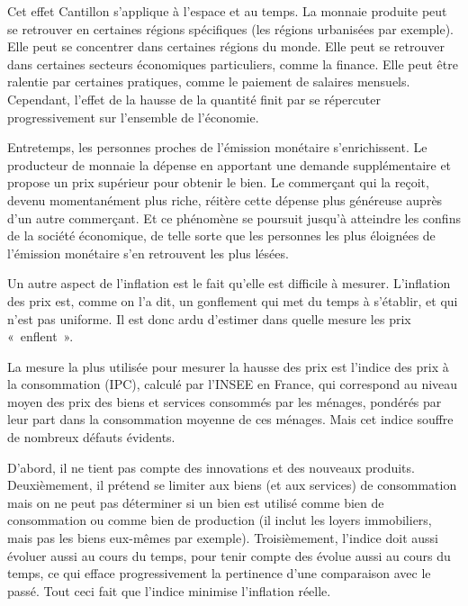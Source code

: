 Cet effet Cantillon s'applique à l'espace et au temps. La monnaie produite peut se retrouver en certaines régions spécifiques (les régions urbanisées par exemple). Elle peut se concentrer dans certaines régions du monde. Elle peut se retrouver dans certaines secteurs économiques particuliers, comme la finance. Elle peut être ralentie par certaines pratiques, comme le paiement de salaires mensuels. Cependant, l'effet de la hausse de la quantité finit par se répercuter progressivement sur l'ensemble de l'économie.

Entretemps, les personnes proches de l'émission monétaire s'enrichissent. Le producteur de monnaie la dépense en apportant une demande supplémentaire et propose un prix supérieur pour obtenir le bien. Le commerçant qui la reçoit, devenu momentanément plus riche, réitère cette dépense plus généreuse auprès d'un autre commerçant. Et ce phénomène se poursuit jusqu'à atteindre les confins de la société économique, de telle sorte que les personnes les plus éloignées de l'émission monétaire s'en retrouvent les plus lésées.


Un autre aspect de l'inflation est le fait qu'elle est difficile à mesurer. L'inflation des prix est, comme on l'a dit, un gonflement qui met du temps à s'établir, et qui n'est pas uniforme. Il est donc ardu d'estimer dans quelle mesure les prix «~enflent~».

La mesure la plus utilisée pour mesurer la hausse des prix est l'indice des prix à la consommation (IPC), calculé par l'INSEE en France, qui correspond au niveau moyen des prix des biens et services consommés par les ménages, pondérés par leur part dans la consommation moyenne de ces ménages. Mais cet indice souffre de nombreux défauts évidents.

D'abord, il ne tient pas compte des innovations et des nouveaux produits. Deuxièmement, il prétend se limiter aux biens (et aux services) de consommation mais on ne peut pas déterminer si un bien est utilisé comme bien de consommation ou comme bien de production (il inclut les loyers immobiliers, mais pas les biens eux-mêmes par exemple). Troisièmement, l'indice doit aussi évoluer aussi au cours du temps, pour tenir compte des  évolue aussi au cours du temps, ce qui efface progressivement la pertinence d'une comparaison avec le passé. Tout ceci fait que l'indice minimise l'inflation réelle.



